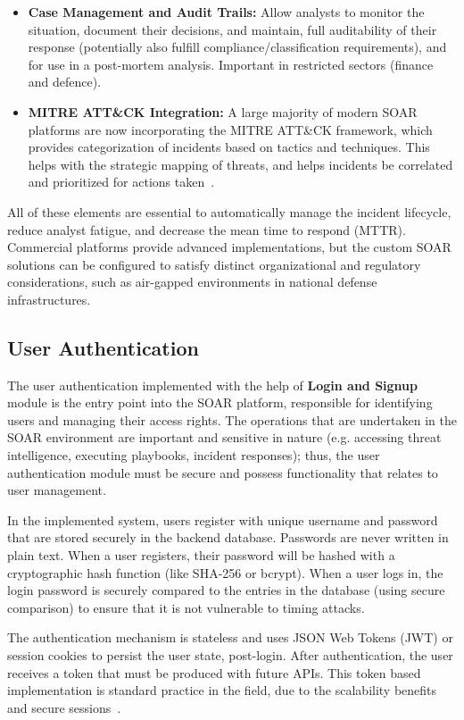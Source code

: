 \begin{itemize}
    \item \textbf{Case Management and Audit Trails:} Allow analysts to monitor the situation, document their decisions, and maintain, full auditability of their response (potentially also fulfill compliance/classification requirements), and for use in a post-mortem analysis. Important in restricted sectors (finance and defence).

    \item \textbf{MITRE ATT\&CK Integration:} A large majority of modern SOAR platforms are now incorporating the MITRE ATT\&CK framework, which provides categorization of incidents based on tactics and techniques. This helps with the strategic mapping of threats, and helps incidents be correlated and prioritized for actions taken~\cite{mitre}.
\end{itemize}

All of these elements are essential to automatically manage the incident lifecycle, reduce analyst fatigue, and decrease the mean time to respond (MTTR). Commercial platforms provide advanced implementations, but the custom SOAR solutions can be configured to satisfy distinct organizational and regulatory considerations, such as air-gapped environments in national defense infrastructures.

\subsection{User Authentication}

The user authentication implemented with the help of \textbf{Login and Signup} module is the entry point into the SOAR platform, responsible for identifying users and managing their access rights. The operations that are undertaken in the SOAR environment are important and sensitive in nature (e.g. accessing threat intelligence, executing playbooks, incident responses); thus, the user authentication module must be secure and possess functionality that relates to user management.

In the implemented system, users register with unique username and password that are stored securely in the backend database. Passwords are never written in plain text. When a user registers, their password will be hashed with a cryptographic hash function (like SHA-256 or bcrypt). When a user logs in, the login password is securely compared to the entries in the database (using secure comparison) to ensure that it is not vulnerable to timing attacks.

The authentication mechanism is stateless and uses JSON Web Tokens (JWT) or session cookies to persist the user state, post-login. After authentication, the user receives a token that must be produced with future APIs. This token based implementation is standard practice in the field, due to the scalability benefits and secure sessions~\cite{paloalto, techtarget}.

